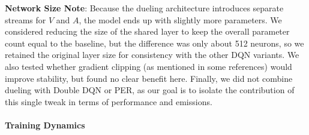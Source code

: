 \noindent
\textbf{Network Size Note}:
Because the dueling architecture introduces separate streams for $V$ and $A$, the model ends up
with slightly more parameters. We considered reducing the size of the shared layer to keep the
overall parameter count equal to the baseline, but the difference was only about 512 neurons,
so we retained the original layer size for consistency with the other DQN variants.
We also tested whether gradient clipping (as mentioned in some references) would improve
stability, but found no clear benefit here.
Finally, we did not combine dueling with Double DQN or PER, as our goal is to isolate the contribution
of this single tweak in terms of performance and emissions.

\paragraph{Training Dynamics}

